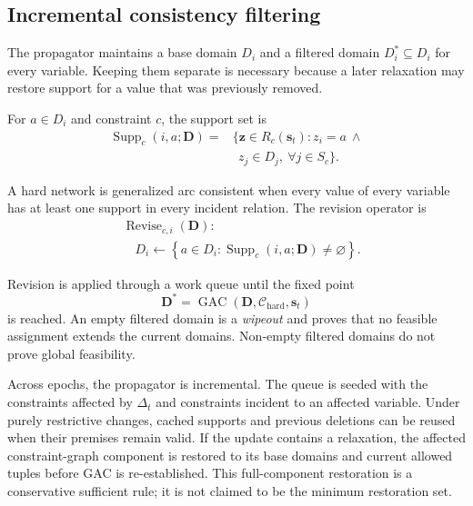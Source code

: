\documentclass[pdflatex,sn-mathphys-num,iicol,oneside]{sn-jnl}
\newcommand{\gac}{\textsc{GAC}\xspace}
\begin{document}
\subsection{Incremental consistency filtering}
\label{sec:gac}

The propagator maintains a base domain $D_i$ and a filtered domain
$D_i^{*}\subseteq D_i$ for every variable. Keeping them separate is
necessary because a later relaxation may restore support for a value
that was previously removed.

For $a\in D_i$ and constraint $c$, the support set is
\begin{equation}
\begin{split}
\operatorname{Supp}_{c}
(i,a;\bm{D})
={}&
\bigl\{
\bm{z}\in R_c(\bm{s}_t):
z_i=a
\ \land\\
&\ \
z_j\in D_j,\
\forall j\in S_c
\bigr\}.
\end{split}
\label{eq:support}
\end{equation}

A hard network is generalized arc consistent when every value of
every variable has at least one support in every incident relation.
The revision operator is
\begin{equation}
\begin{split}
&\operatorname{Revise}_{c,i}(\bm{D}):
\\
&\quad
D_i
\leftarrow
\left\{
a\in D_i:
\operatorname{Supp}_{c}(i,a;\bm{D})
\neq\varnothing
\right\}.
\end{split}
\label{eq:revise}
\end{equation}

Revision is applied through a work queue until the fixed point
\begin{equation}
\bm{D}^{*}
=
\operatorname{GAC}
\left(
\bm{D},
\mathcal{C}_{\mathrm{hard}},
\bm{s}_t
\right)
\end{equation}
is reached. An empty filtered domain is a \emph{wipeout} and proves
that no feasible assignment extends the current domains. Non-empty
filtered domains do not prove global feasibility.

Across epochs, the propagator is incremental. The queue is seeded
with the constraints affected by $\Delta_t$ and constraints incident
to an affected variable. Under purely restrictive changes, cached
supports and previous deletions can be reused when their premises
remain valid. If the update contains a relaxation, the affected
constraint-graph component is restored to its base domains and
current allowed tuples before \gac is re-established. This
full-component restoration is a conservative sufficient rule; it is
not claimed to be the minimum restoration set.
\end{document}
